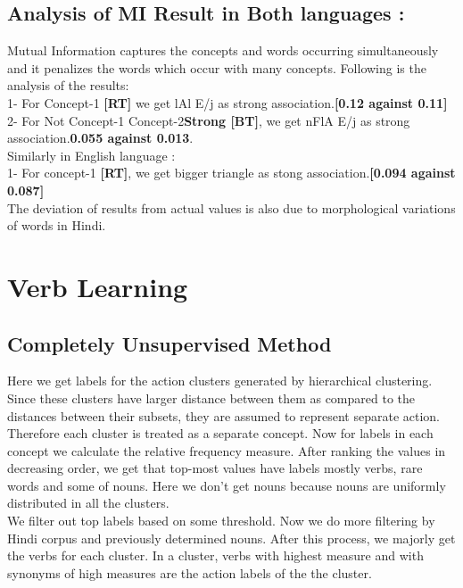 \def\DevnagVersion{2.15}\documentclass[a4paper, 11pt, notitlepage]{report}
\begin{document}
\subsection{Analysis of MI Result in Both languages :}
Mutual Information captures the concepts and words occurring simultaneously and it penalizes the words which occur with many concepts. Following is the analysis of the results:\\
1- For Concept-1 {\bf [RT] } we get {\dn lAl E/j } as strong association.{\bf [0.12 against 0.11]}\\
2- For Not Concept-1 Concept-2{\bf Strong [BT]}, we get {\dn nFlA E/j} as strong association.{\bf 0.055 against 0.013}.\\
Similarly in English language :\\
1- For concept-1 {\bf [RT]}, we get bigger triangle as stong association.{\bf [0.094 against 0.087]}\\
The deviation of results from actual values is also due to morphological variations of words in Hindi.\\

\hspace*{10pt} \section{Verb Learning }
\subsection{Completely Unsupervised Method}
Here we get labels for the action clusters generated by hierarchical clustering. Since these clusters have larger distance between them as compared to the distances between their subsets, they are assumed to represent separate action. Therefore each cluster is treated as a separate concept. Now for labels in each concept we calculate the relative frequency measure. After ranking the values in decreasing order, we get that top-most values have labels mostly verbs, rare words and some of nouns. Here we don't get nouns because nouns are uniformly distributed in all the clusters.\\
We filter out top labels based on some threshold. Now we do more filtering by Hindi 	corpus and previously determined nouns. After this process, we majorly get the verbs for each cluster. In a cluster, verbs with highest measure and with synonyms of high measures are the action labels of the the cluster.\\\\
\end{document}
